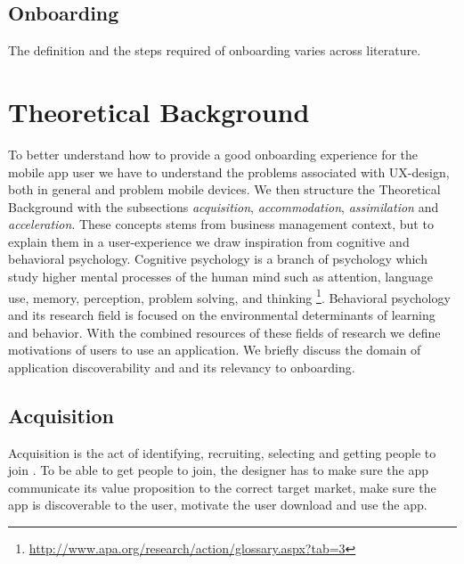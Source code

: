\subsection{Onboarding}
The definition and the steps required of onboarding varies across literature.

\section{Theoretical Background}
To better understand how to provide a good onboarding experience for the mobile app user we have to understand the problems associated with UX-design, both in general and problem mobile devices. We then structure the Theoretical Background with the subsections \textit{acquisition}, \textit{accommodation}, \textit{assimilation} and \textit{acceleration}. These concepts stems from business management context, but to explain them in a user-experience we draw inspiration from cognitive and behavioral psychology. Cognitive psychology is a branch of psychology which study higher mental processes of the human mind such as attention, language use, memory, perception, problem solving, and thinking \footnote{\url{http://www.apa.org/research/action/glossary.aspx?tab=3}}. Behavioral psychology and its research field is focused on the environmental determinants of learning and behavior. With the combined resources of these fields of research we define motivations of users to use an application. We briefly discuss the domain of application discoverability and and its relevancy to onboarding.

\subsection{Acquisition}
Acquisition is the act of identifying, recruiting, selecting and getting people to join \cite{Bradt2009}. To be able to get people to join, the designer has to make sure the app communicate its value proposition to the correct target market, make sure the app is discoverable to the user, motivate the user download and use the app.

